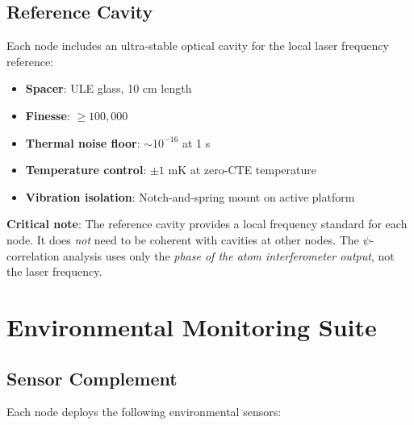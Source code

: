 \documentclass[12pt,a4paper]{article}
\begin{document}
\subsection{Reference Cavity}

Each node includes an ultra-stable optical cavity for the local
laser frequency reference:
\begin{itemize}
\item \textbf{Spacer}: ULE glass, 10 cm length
\item \textbf{Finesse}: $\geq 100{,}000$
\item \textbf{Thermal noise floor}: $\sim 10^{-16}$ at 1 s
\item \textbf{Temperature control}: $\pm 1$ mK at zero-CTE temperature
\item \textbf{Vibration isolation}: Notch-and-spring mount on active
platform
\end{itemize}

\textbf{Critical note}: The reference cavity provides a local frequency
standard for each node. It does \emph{not} need to be coherent with
cavities at other nodes. The $\psi$-correlation analysis uses only the
\emph{phase of the atom interferometer output}, not the laser frequency.


\section{Environmental Monitoring Suite}\label{sec:ems}

\subsection{Sensor Complement}

Each node deploys the following environmental sensors:
\end{document}
